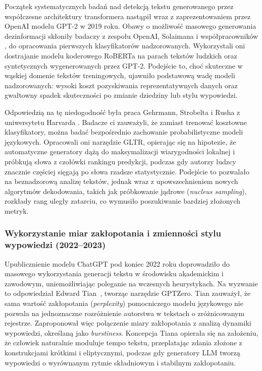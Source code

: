 Początek systematycznych badań nad detekcją tekstu generowanego przez współczesne architektury transformera nastąpił wraz z zaprezentowaniem przez OpenAI modelu GPT-2 w 2019 roku. Obawy o możliwość masowego generowania dezinformacji skłoniły badaczy z zespołu OpenAI, Solaimana i współpracowników \cite{solaiman2019release}, do opracowania pierwszych klasyfikatorów nadzorowanych. Wykorzystali oni dostrajanie modelu koderowego RoBERTa na parach tekstów ludzkich oraz syntetycznych wygenerowanych przez GPT-2. Podejście to, choć skuteczne w wąskiej domenie tekstów treningowych, ujawniło podstawową wadę modeli nadzorowanych: wysoki koszt pozyskiwania reprezentatywnych danych oraz gwałtowny spadek skuteczności po zmianie dziedziny lub stylu wypowiedzi.

Odpowiedzią na tę niedogodność była praca Gehrmann, Strobelta i Rusha z uniwersytetu Harvarda \cite{gehrmann2019gltr}. Badacze ci zauważyli, że zamiast trenować kosztowne klasyfikatory, można badać bezpośrednio zachowanie probabilistyczne modeli językowych. Opracowali oni narzędzie GLTR, opierając się na hipotezie, że automatyczne generatory dążą do maksymalizacji wiarygodności lokalnej i próbkują słowa z czołówki rankingu predykcji, podczas gdy autorzy ludzcy znacznie częściej sięgają po słowa rzadsze statystycznie. Podejście to pozwalało na beznadzorową analizę tekstów, jednak wraz z upowszechnieniem nowych algorytmów dekodowania, takich jak próbkowanie jądrowe (\textit{nucleus sampling}), rozkłady rang uległy zatarciu, co wymusiło poszukiwanie bardziej złożonych metryk.

\subsubsection{Wykorzystanie miar zakłopotania i zmienności stylu wypowiedzi (2022--2023)}

Upublicznienie modelu ChatGPT pod koniec 2022 roku doprowadziło do masowego wykorzystania generacji tekstu w środowisku akademickim i zawodowym, uniemożliwiając poleganie na wczesnych heurystykach. Na wyzwanie to odpowiedział Edward Tian~\cite{gptzero2023}, tworząc narzędzie GPTZero. Tian zauważył, że sama wartość zakłopotania (\textit{perplexity}) pomocniczego modelu językowego nie pozwala na jednoznaczne rozróżnienie autorstwa w tekstach o zróżnicowanym rejestrze. Zaproponował więc połączenie miary zakłopotania z analizą dynamiki wypowiedzi, określaną jako \textit{burstiness}. Koncepcja Tiana opierała się na założeniu, że człowiek naturalnie moduluje tempo tekstu, przeplatając zdania złożone z konstrukcjami krótkimi i eliptycznymi, podczas gdy generatory LLM tworzą wypowiedzi o wyrównanym rytmie składniowym i stabilnym zakłopotaniu.

